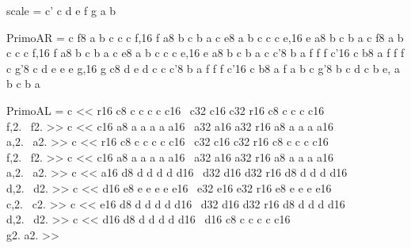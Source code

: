 


scale = \relative c' { c d e f g a b }


PrimoAR = {
  { \relative c { f8 a b c c c f,16 f a8 b c b a } }
  { \relative c { e8 a b c c c e,16 e a8 b c b a } }
  { \relative c { f8 a b c c c f,16 f a8 b c b a } }
  { \relative c { e8 a b c c c e,16 e a8 b c b a } }
  { \relative c { c'8 b a f f f c'16 c b8 a f f f } }
  { \relative c { g'8 c d e e e g,16 g c8 d e d c } }
  { \relative c { c'8 b a f f f c'16 c b8 a f a b } }
  { \relative c { g'8 b c d c b e, a b c b a } }
}

PrimoAL = {
  { \relative c { << { r16 c8 c c c c c16~ c32 c16 c32 r16 c8 c c c c16~ } \\ { f,2.~ f2. } >> } }
  { \relative c { << { c16 a8 a a a a a16~ a32 a16 a32 r16 a8 a a a a16 } \\ { a,2.~ a2. } >> } }
  { \relative c { << { r16 c8 c c c c c16~ c32 c16 c32 r16 c8 c c c c16~ } \\ { f,2.~ f2. } >> } }
  { \relative c { << { c16 a8 a a a a a16~ a32 a16 a32 r16 a8 a a a a16~ } \\ { a,2.~ a2. } >> } }
  { \relative c { << { a16 d8 d d d d d16~ d32 d16 d32 r16 d8 d d d d16~ } \\ { d,2.~ d2. } >> } }
  { \relative c { << { d16 e8 e e e e e16~ e32 e16 e32 r16 e8 e e e e16 } \\ { c,2.~ c2. } >> } }
  { \relative c { << { e16 d8 d d d d d16~ d32 d16 d32 r16 d8 d d d d16~ } \\ { d,2.~ d2. } >> } }
  { \relative c { << { d16 d8 d d d d d16~ d16 c8 c c c c c16 } \\ { g2. a2. } >> } }
}

